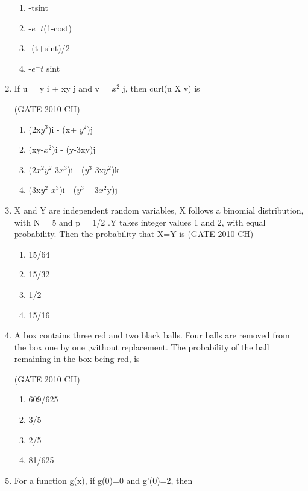 \documentclass[journal,12pt,onecolumn]{exam}
\theoremstyle{remark}
\begin{document}
\begin{enumerate}
\begin{enumerate}
    \item -tsint
    \item -$e^-t$(1-cost)\\
    \item -(t+sint)/2
    \item -$e^-t$ sint
\end{enumerate}
\item 
 If u = y i + xy j and v = $x^2$ j, then curl(u X v) is

 \hfill{(GATE 2010 CH)}\\
 
 \begin{enumerate}
     \item (2x$y^3$)i - (x+ $y^2$)j
     \item (xy-$x^2$)i - (y-3xy)j
     \item (2$x^2y^2$-3$x^3$)i - ($y^3$-3x$y^2$)k
     \item (3x$y^2$-$x^3$)i - ($y^3-3x^2$y)j
 \end{enumerate}
\item 
 X and Y are independent random variables, X follows a binomial distribution, with N = 5 and p = 1/2 .Y takes integer values 1 and 2, with equal probability. Then the probability that X=Y is
 \hfill{(GATE 2010 CH)}\\

 \begin{enumerate}
     \item 15/64
     \item 15/32
     \item 1/2
     \item 15/16
     
 \end{enumerate}
\item 
  A box contains three red and two black balls. Four balls are removed from the box one by one ,without replacement. The probability of the ball remaining in the box being red, is

  \hfill{(GATE 2010 CH)}\\

  \begin{enumerate}
      \item 609/625
      \item 3/5
      \item 2/5
      \item 81/625
  \end{enumerate}
 \item 
   For a function g(x), if g(0)=0 and g'(0)=2, then


\end{enumerate}
\end{document}
